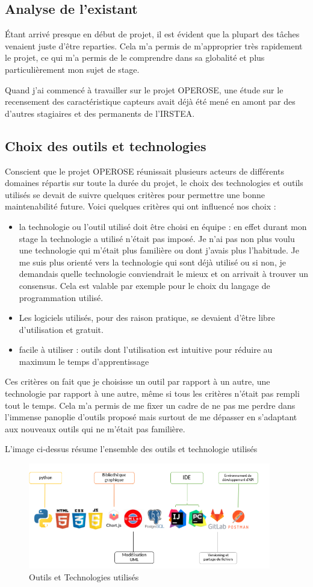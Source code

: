 \subsection{Analyse de l’existant} 
Étant arrivé presque en début de projet, il est évident que la plupart des tâches venaient juste d’être reparties. Cela m’a permis de m’approprier très rapidement le projet, ce qui m’a permis de le comprendre dans sa globalité et plus particulièrement mon sujet de stage.   

Quand j’ai commencé à travailler sur le projet OPEROSE, une étude sur le recensement des caractéristique capteurs avait déjà été mené en amont par des d’autres stagiaires et des permanents de l’IRSTEA. 

\subsection{Choix des outils et technologies}

Conscient que le projet OPEROSE réunissait plusieurs acteurs de différents domaines répartis sur toute la durée du projet, le choix des technologies et outils utilisés se devait de suivre quelques critères pour permettre une bonne maintenabilité future. Voici quelques critères qui ont influencé nos choix : 
\begin{itemize}
 

  \item la technologie ou l’outil utilisé doit être choisi en équipe : en effet durant mon stage la technologie a utilisé n’était pas imposé. Je n’ai pas non plus voulu une technologie qui m’était plus familière ou dont j’avais plus l’habitude. Je me suis plus orienté vers la technologie qui sont déjà utilisé ou si non, je demandais quelle technologie conviendrait le mieux et on arrivait à trouver un consensus. Cela est valable par exemple pour le choix du langage de programmation utilisé. 

  \item Les logiciels utilisés, pour des raison pratique, se devaient d’être libre d’utilisation et gratuit. 

   \item facile à utiliser : outils dont l’utilisation est intuitive pour réduire au maximum le temps d’apprentissage 
\end{itemize}
Ces critères on fait que je choisisse un outil par rapport à un autre, une technologie par rapport à une autre, même si tous les critères n’était pas rempli tout le temps. Cela m’a permis de me fixer un cadre de ne pas me perdre dans l’immense panoplie d’outils proposé mais surtout de me dépasser en s’adaptant aux nouveaux outils qui ne m'était pas familière. 

L'image ci-dessus résume l’ensemble des outils et technologie utilisés 
\begin{figure}
\begin{center}
\includegraphics[width=400px]{images/logicielutilises.png}
\end{center}
\caption{Outils et Technologies utilisés}
\label{Outils et Technologies utilisés}
\end{figure}

